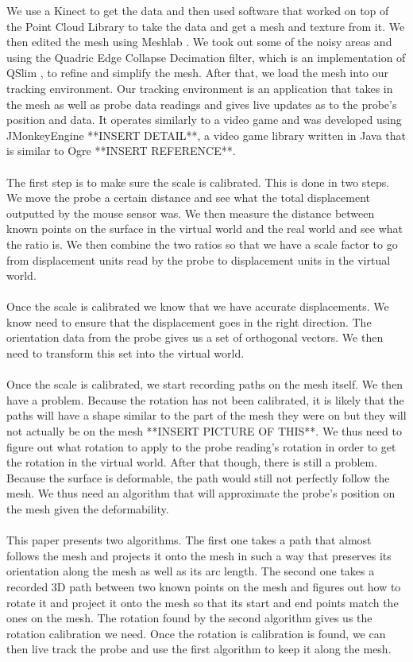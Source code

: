 \documentclass[11pt,psfig]{article}
\begin{document}
We use a Kinect to get the data and then used software that worked on top of the Point Cloud Library \cite{pointcloudlibrary} to take the data and get a mesh and texture from it. We then edited the mesh using Meshlab \cite{meshlab}. We took out some of the noisy areas and using the Quadric Edge Collapse Decimation filter, which is an implementation of QSlim \cite{qslim}, to refine and simplify the mesh. After that, we load the mesh into our tracking environment. Our tracking environment is an application that takes in the mesh as well as probe data readings and gives live updates as to the probe's position and data. It operates similarly to a video game and was developed using JMonkeyEngine **INSERT DETAIL**, a video game library written in Java that is similar to Ogre **INSERT REFERENCE**. \\
\\
The first step is to make sure the scale is calibrated. This is done in two steps. We move the probe a certain distance and see what the total displacement outputted by the mouse sensor was. We then measure the distance between known points on the surface in the virtual world and the real world and see what the ratio is. We then combine the two ratios so that we have a scale factor to go from displacement units read by the probe to displacement units in the virtual world. \\
\\
Once the scale is calibrated we know that we have accurate displacements. We know need to ensure that the displacement goes in the right direction. The orientation data from the probe gives us a set of orthogonal vectors. We then need to transform this set into the virtual world.\\
\\
Once the scale is calibrated, we start recording paths on the mesh itself. We then have a problem. Because the rotation has not been calibrated, it is likely that the paths will have a shape similar to the part of the mesh they were on but they will not actually be on the mesh **INSERT PICTURE OF THIS**. We thus need to figure out what rotation to apply to the probe reading's rotation in order to get the rotation in the virtual world. After that though, there is still a problem. Because the surface is deformable, the path would still not perfectly follow the mesh. We thus need an algorithm that will approximate the probe's position on the mesh given the deformability. \\
\\
This paper presents two algorithms. The first one takes a path that almost follows the mesh and projects it onto the mesh in such a way that preserves its orientation along the mesh as well as its arc length. The second one takes a recorded 3D path between two known points on the mesh and figures out how to rotate it and project it onto the mesh so that its start and end points match the ones on the mesh. The rotation found by the second algorithm gives us the rotation calibration we need. Once the rotation is calibration is found, we can then live track the probe and use the first algorithm to keep it along the mesh. 
\end{document}
